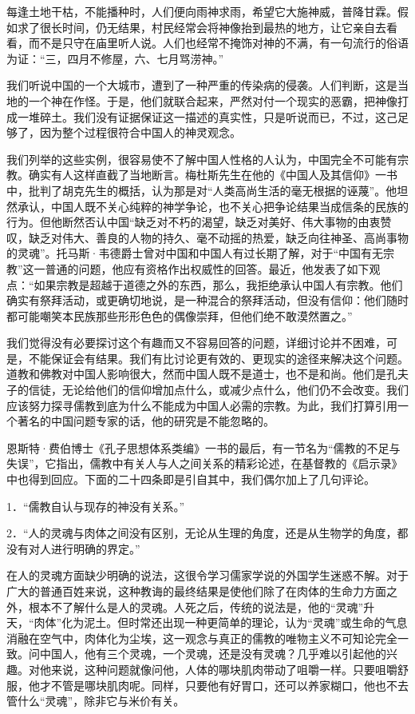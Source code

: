 \documentclass[12pt,oneside]{book}
\begin{document}
\begin{common-format}
每逢土地干枯，不能播种时，人们便向雨神求雨，希望它大施神威，普降甘霖。假如求了很长时间，仍无结果，村民经常会将神像抬到最热的地方，让它亲自去看看，而不是只守在庙里听人说。人们也经常不掩饰对神的不满，有一句流行的俗语为证：“三，四月不修屋，六、七月骂涝神。” 

我们听说中国的一个大城市，遭到了一种严重的传染病的侵袭。人们判断，这是当地的一个神在作怪。于是，他们就联合起来，严然对付一个现实的恶霸，把神像打成一堆碎土。我们没有证据保证这一描述的真实性，只是听说而已，不过，这己足够了，因为整个过程很符合中国人的神灵观念。 

我们列举的这些实例，很容易使不了解中国人性格的人认为，中国完全不可能有宗教。确实有人这样直截了当地断言。梅杜斯先生在他的《中国人及其信仰》一书中，批判了胡克先生的概括，认为那是对“人类高尚生活的毫无根据的诬蔑”。他坦然承认，中国人既不关心纯粹的神学争论，也不关心把争论结果当成信条的民族的行为。但他断然否认中国“缺乏对不朽的渴望，缺乏对美好、伟大事物的由衷赞叹，缺乏对伟大、善良的人物的持久、毫不动摇的热爱，缺乏向往神圣、高尚事物的灵魂”。托马斯·韦德爵士曾对中国和中国人有过长期了解，对于“中国有无宗教”这一普通的问题，他应有资格作出权威性的回答。最近，他发表了如下观点：“如果宗教是超越于道德之外的东西，那么，我拒绝承认中国人有宗教。他们确实有祭拜活动，或更确切地说，是一种混合的祭拜活动，但没有信仰：他们随时都可能嘲笑本民族那些形形色色的偶像崇拜，但他们绝不敢漠然置之。” 

我们觉得没有必要探讨这个有趣而又不容易回答的问题，详细讨论并不困难，可是，不能保证会有结果。我们有比讨论更有效的、更现实的途径来解决这个问题。道教和佛教对中国人影响很大，然而中国人既不是道士，也不是和尚。他们是孔夫子的信徒，无论给他们的信仰增加点什么，或减少点什么，他们仍不会改变。我们应该努力探寻儒教到底为什么不能成为中国人必需的宗教。为此，我们打算引用一个著名的中国问题专家的话，他的研究是不能忽略的。 

恩斯特·费伯博士《孔子思想体系类编》一书的最后，有一节名为“儒教的不足与失误”，它指出，儒教中有关人与人之间关系的精彩论述，在基督教的《启示录》中也得到回应。下面的二十四条即是引自其中，我们偶尔加上了几句评论。 

1．“儒教自认与现存的神没有关系。” 

2．“人的灵魂与肉体之间没有区别，无论从生理的角度，还是从生物学的角度，都没有对人进行明确的界定。” 

在人的灵魂方面缺少明确的说法，这很令学习儒家学说的外国学生迷惑不解。对于广大的普通百姓来说，这种教诲的最终结果是使他们除了在肉体的生命力方面之外，根本不了解什么是人的灵魂。人死之后，传统的说法是，他的“灵魂”升天，“肉体”化为泥土。但时常还出现一种更简单的理论，认为“灵魂”或生命的气息消融在空气中，肉体化为尘埃，这一观念与真正的儒教的唯物主义不可知论完全一致。问中国人，他有三个灵魂，一个灵魂，还是没有灵魂？几乎难以引起他的兴趣。对他来说，这种问题就像问他，人体的哪块肌肉带动了咀嚼一样。只要咀嚼舒服，他才不管是哪块肌肉呢。同样，只要他有好胃口，还可以养家糊口，他也不去管什么“灵魂”，除非它与米价有关。 


\end{common-format}
\end{document}

